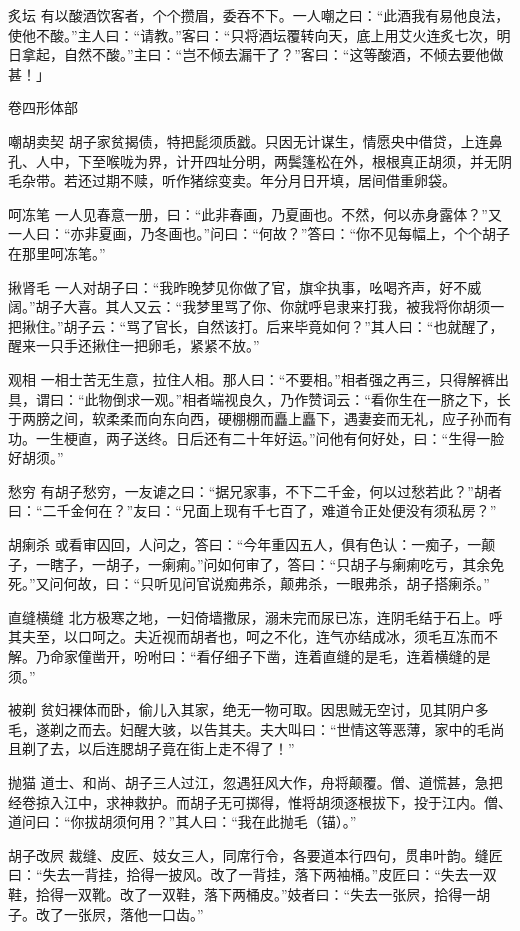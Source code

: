\documentclass[12pt,UTF8]{ctexbook}
\begin{document}
炙坛
有以酸酒饮客者，个个攒眉，委吞不下。一人嘲之曰：“此酒我有易他良法，使他不酸。”主人曰：“请教。”客曰：“只将酒坛覆转向天，底上用艾火连炙七次，明日拿起，自然不酸。”主曰：“岂不倾去漏干了？”客曰：“这等酸酒，不倾去要他做甚！」

卷四形体部

嘲胡卖契
胡子家贫揭债，特把髭须质戤。只因无计谋生，情愿央中借贷，上连鼻孔、人中，下至喉咙为界，计开四址分明，两鬓篷松在外，根根真正胡须，并无阴毛杂带。若还过期不赎，听作猪综变卖。年分月日开填，居间借重卵袋。

呵冻笔
一人见春意一册，曰：“此非春画，乃夏画也。不然，何以赤身露体？”又一人曰：“亦非夏画，乃冬画也。”问曰：“何故？”答曰：“你不见每幅上，个个胡子在那里呵冻笔。”

揪肾毛
一人对胡子曰：“我昨晚梦见你做了官，旗伞执事，吆喝齐声，好不威阔。”胡子大喜。其人又云：“我梦里骂了你、你就呼皂隶来打我，被我将你胡须一把揪住。”胡子云：“骂了官长，自然该打。后来毕竟如何？”其人曰：“也就醒了，醒来一只手还揪住一把卵毛，紧紧不放。”

观相
一相士苦无生意，拉住人相。那人曰：“不要相。”相者强之再三，只得解裤出具，谓曰：“此物倒求一观。”相者端视良久，乃作赞词云：“看你生在一脐之下，长于两膀之间，软柔柔而向东向西，硬棚棚而矗上矗下，遇妻妾而无礼，应子孙而有功。一生梗直，两子送终。日后还有二十年好运。”问他有何好处，曰：“生得一脸好胡须。”

愁穷
有胡子愁穷，一友谑之曰：“据兄家事，不下二千金，何以过愁若此？”胡者曰：“二千金何在？”友曰：“兄面上现有千七百了，难道令正处便没有须私房？”

胡瘌杀
或看审囚回，人问之，答曰：“今年重囚五人，俱有色认：一痴子，一颠子，一瞎子，一胡子，一瘌痢。”问如何审了，答曰：“只胡子与瘌痢吃亏，其余免死。”又问何故，曰：“只听见问官说痴弗杀，颠弗杀，一眼弗杀，胡子搭瘌杀。”

直缝横缝
北方极寒之地，一妇倚墙撒尿，溺未完而尿已冻，连阴毛结于石上。呼其夫至，以口呵之。夫近视而胡者也，呵之不化，连气亦结成冰，须毛互冻而不解。乃命家僮凿开，吩咐曰：“看仔细子下凿，连着直缝的是毛，连着横缝的是须。”

被剃
贫妇裸体而卧，偷儿入其家，绝无一物可取。因思贼无空讨，见其阴户多毛，遂剃之而去。妇醒大骇，以告其夫。夫大叫曰：“世情这等恶薄，家中的毛尚且剃了去，以后连腮胡子竟在街上走不得了！”

抛猫
道士、和尚、胡子三人过江，忽遇狂风大作，舟将颠覆。僧、道慌甚，急把经卷掠入江中，求神救护。而胡子无可掷得，惟将胡须逐根拔下，投于江内。僧、道问曰：“你拔胡须何用？”其人曰：“我在此抛毛（锚）。”

胡子改屄
裁缝、皮匠、妓女三人，同席行令，各要道本行四句，贯串叶韵。缝匠曰：“失去一背挂，拾得一披风。改了一背挂，落下两袖桶。”皮匠曰：“失去一双鞋，拾得一双靴。改了一双鞋，落下两桶皮。”妓者曰：“失去一张屄，拾得一胡子。改了一张屄，落他一口齿。”
\end{document}
